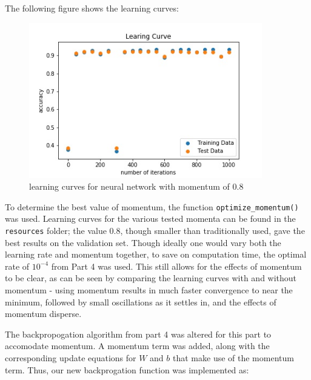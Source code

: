 \documentclass{article}
\begin{document}
   The following figure shows the learning curves:
      \begin{figure}[H] \centering
         \includegraphics[width=4in]{resources/part5}
         \caption{learning curves for neural network  with momentum of 0.8}
      \end{figure}

  To determine the best value of momentum, the function \texttt{optimize\_momentum()} was used.
  Learning curves for the various tested momenta can be found in the \texttt{resources} folder;
  the value 0.8, though smaller than traditionally used, gave the best results on the validation set.
  Though ideally one would vary both the learning rate and momentum together, to save on
  computation time, the optimal rate of $10^{-4}$ from Part 4 was used. This still allows for
  the effects of momentum to be clear, as can be seen by comparing the learning curves with and
  without momentum - using momentum results in much faster convergence to near the minimum, followed
  by small oscillations as it settles in, and the effects of momentum disperse.

  The backpropogation algorithm from part 4 was altered for this part to accomodate momentum.
  A momentum term was added, along with  the corresponding update equations
  for $W$ and $b$ that make use of the momentum term.
  Thus, our new backprogation function was implemented as:
\end{document}
